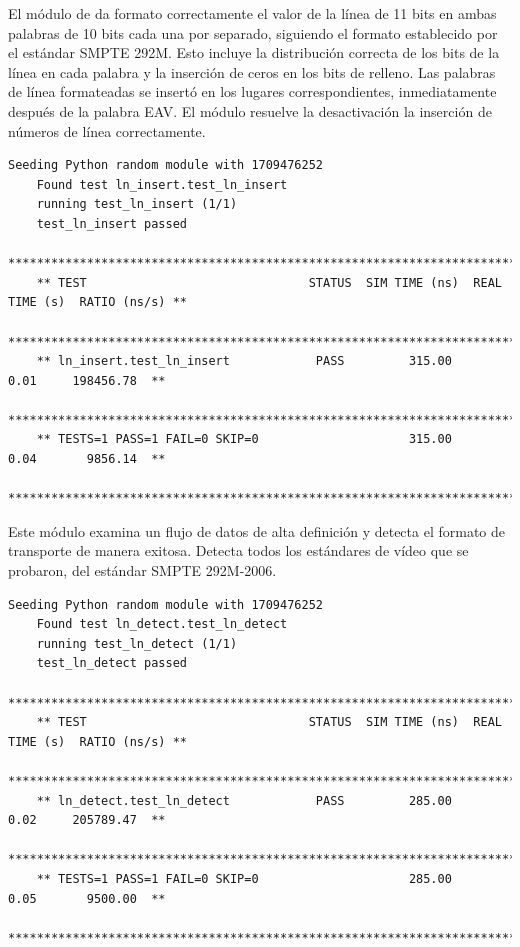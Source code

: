   El módulo de da formato correctamente el valor de la línea de 11 bits en ambas
  palabras de 10 bits cada una por separado, siguiendo el formato establecido por
  el estándar SMPTE 292M. Esto incluye la distribución correcta de los bits de la
  línea en cada palabra y la inserción de ceros en los bits de relleno. Las
  palabras de línea formateadas se insertó en los lugares correspondientes,
  inmediatamente después de la palabra EAV\@. El módulo resuelve la desactivación
  la inserción de números de línea correctamente.

  {\tiny\begin{lstlisting}[caption= "Resultados \textit{test} de insertor de número de línea.]
    Seeding Python random module with 1709476252
    Found test ln_insert.test_ln_insert
    running test_ln_insert (1/1)
    test_ln_insert passed
    *******************************************************************************************
    ** TEST                               STATUS  SIM TIME (ns)  REAL TIME (s)  RATIO (ns/s) **
    *******************************************************************************************
    ** ln_insert.test_ln_insert            PASS         315.00           0.01     198456.78  **
    *******************************************************************************************
    ** TESTS=1 PASS=1 FAIL=0 SKIP=0                     315.00           0.04       9856.14  **
    *******************************************************************************************
  \end{lstlisting}}

  Este módulo examina un flujo de datos de alta definición y detecta el formato
  de transporte de manera exitosa. Detecta todos los estándares de vídeo que se
  probaron, del estándar SMPTE 292M-2006\@.

  {\tiny\begin{lstlisting}[caption= "Resultados \textit{test} de detector de número de línea.]
    Seeding Python random module with 1709476252
    Found test ln_detect.test_ln_detect
    running test_ln_detect (1/1)
    test_ln_detect passed
    *******************************************************************************************
    ** TEST                               STATUS  SIM TIME (ns)  REAL TIME (s)  RATIO (ns/s) **
    *******************************************************************************************
    ** ln_detect.test_ln_detect            PASS         285.00           0.02     205789.47  **
    *******************************************************************************************
    ** TESTS=1 PASS=1 FAIL=0 SKIP=0                     285.00           0.05       9500.00  **
    *******************************************************************************************
  \end{lstlisting}}

